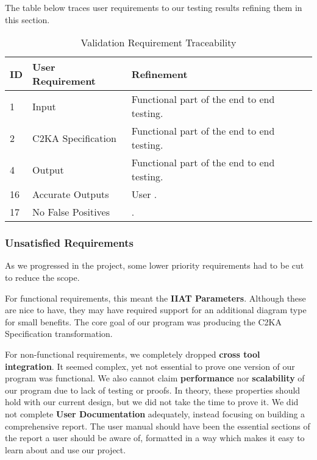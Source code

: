 The table below traces user requirements to our testing results refining them in this section.
\begin{table}[htbp]
    \centering
    \caption{Validation Requirement Traceability}\label{tab:test-res-table}
    \begin{tabularx}{\textwidth}{| l | l | X |}
        \hline
        \textbf{ID} & \textbf{User Requirement} & \textbf{Refinement} \\
        \hline
        1 & Input & Functional part of the end to end testing. \\ \hline
        2 & C2KA Specification & Functional part of the end to end testing.\\ \hline
        4 & Output & Functional part of the end to end testing.\\ \hline
        16 & Accurate Outputs & User . \\ \hline %
        17 & No False Positives & . \\ \hline %
    \end{tabularx}
\end{table}

\newpage
\subsubsection{Unsatisfied Requirements} \label{subsubsec:unsat-reqs}
As we progressed in the project, some lower priority requirements had to be cut to reduce the scope.

For functional requirements, this meant the \textbf{IIAT Parameters}.
Although these are nice to have, they may have required support for an additional diagram type for small benefits.
The core goal of our program was producing the C2KA Specification transformation.

For non-functional requirements, we completely dropped \textbf{cross tool integration}.
It seemed complex, yet not essential to prove one version of our program was functional.
We also cannot claim \textbf{performance} nor \textbf{scalability} of our program due to lack of testing or proofs.
In theory, these properties should hold with our current design, but we did not take the time to prove it.
We did not complete \textbf{User Documentation} adequately, instead focusing on building a comprehensive report.
The user manual should have been the essential sections of the report a user should be aware of,
formatted in a way which makes it easy to learn about and use our project.

